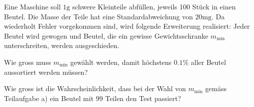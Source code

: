Eine Maschine soll $1\text{g}$ schwere Kleinteile abfüllen, 
jeweils 100 Stück in einen Beutel.
Die Masse der Teile hat eine Standardabweichung von $20\text{mg}$.
Da wiederholt Fehler vorgekommen sind,
wird folgende Erweiterung realisiert: Jeder Beutel wird gewogen und
Beutel, die ein gewisse Gewichtsschranke $m_{\text{min}}$ unterschreiten,
werden ausgeschieden.
\begin{teilaufgaben}
\item Wie gross muss $m_{\text{min}}$ gewählt werden, damit höchstens
$0.1\%$ aller Beutel aussortiert werden müssen?
\item Wie gross ist die Wahrscheinlichkeit, dass bei der Wahl von
$m_{\text{min}}$ gemäss Teilaufgabe a) ein Beutel mit $99$ Teilen den
Test passiert?
\end{teilaufgaben}


